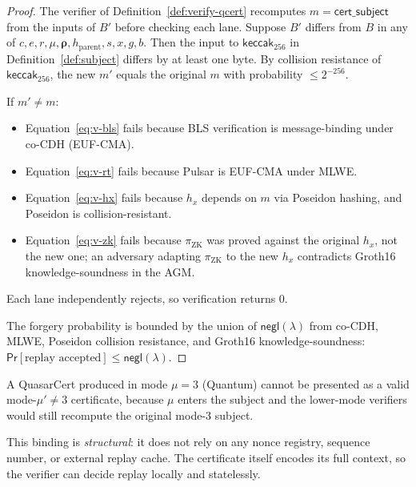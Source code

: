 \begin{proof}
The verifier of Definition~\ref{def:verify-qcert} recomputes
$m = \mathsf{cert\_subject}$ from the inputs of $B'$ before checking
each lane. Suppose $B'$ differs from $B$ in any of $c, e, r, \mu,
\boldsymbol{\rho}, h_{\text{parent}}, s, x, g, b$. Then the input to
$\mathsf{keccak}_{256}$ in Definition~\ref{def:subject} differs by at
least one byte. By collision resistance of $\mathsf{keccak}_{256}$, the
new $m'$ equals the original $m$ with probability $\leq 2^{-256}$.

If $m' \neq m$:
\begin{itemize}[leftmargin=2em,nosep]
\item Equation~\eqref{eq:v-bls} fails because BLS verification is
      message-binding under co-CDH (EUF-CMA).
\item Equation~\eqref{eq:v-rt} fails because Pulsar is EUF-CMA under
      MLWE.
\item Equation~\eqref{eq:v-hx} fails because $h_x$ depends on $m$ via
      Poseidon hashing, and Poseidon is collision-resistant.
\item Equation~\eqref{eq:v-zk} fails because $\pi_{\mathrm{ZK}}$ was
      proved against the original $h_x$, not the new one; an adversary
      adapting $\pi_{\mathrm{ZK}}$ to the new $h_x$ contradicts Groth16
      knowledge-soundness in the AGM.
\end{itemize}
Each lane independently rejects, so verification returns 0.

The forgery probability is bounded by the union of
$\mathsf{negl}(\lambda)$ from co-CDH, MLWE, Poseidon collision
resistance, and Groth16 knowledge-soundness:
$\mathsf{Pr}[\text{replay accepted}] \leq \mathsf{negl}(\lambda)$.
\end{proof}

\begin{corollary}
A QuasarCert produced in mode $\mu = 3$ (Quantum) cannot be presented
as a valid mode-$\mu' \neq 3$ certificate, because $\mu$ enters the
subject and the lower-mode verifiers would still recompute the original
mode-3 subject.
\end{corollary}

\begin{remark}
This binding is \emph{structural}: it does not rely on any nonce
registry, sequence number, or external replay cache. The certificate
itself encodes its full context, so the verifier can decide replay
locally and statelessly.
\end{remark}

